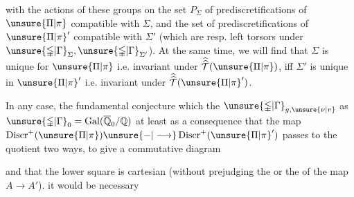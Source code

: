 
with the actions of these groups on the set $P_{\Sigma}$ of prediscretifications of $\unsure{\Pi|\pi}$ compatible with $\Sigma$, and the set  of prediscretifications of $\unsure{\Pi|\pi}'$ compatible with $\Sigma'$ (which are resp. left torsors under $\unsure{\mathbb{\Gamma}|\Gamma}_{\Sigma},\unsure{\mathbb{\Gamma}|\Gamma}_{\Sigma'}$). At the same time, we will find  that $\Sigma$ is unique for $\unsure{\Pi|\pi}$ i.e. invariant under $\widehat{\widehat{\mathcal T}}(\unsure{\Pi|\pi})$, iff $\Sigma'$ is unique in $\unsure{\Pi|\pi}'$ i.e. invariant under $\widehat{\widehat{\mathcal T}}(\unsure{\Pi|\pi}')$.

In any case, the fundamental conjecture which  the $\unsure{\mathbb{\Gamma}|\Gamma}_{g,\unsure{\nu|v}}$ as $\unsure{\mathbb{\Gamma}|\Gamma}_0=\operatorname{Gal}(\overline{\mathbb Q}_0/\mathbb Q)$  at least as a consequence that the map $\operatorname{Discr}^{+}(\unsure{\Pi|\pi})\unsure{-|\longrightarrow}\operatorname{Discr}^{+}(\unsure{\Pi|\pi}')$ passes to the quotient  two ways, to give a commutative diagram


and that the  lower square is cartesian (without prejudging the  or the  of the map $A\longrightarrow A'$).  it would be necessary